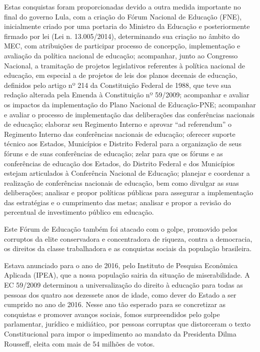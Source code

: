 Estas conquistas foram proporcionadas devido a outra medida importante
no final do governo Lula, com a criação do Fórum Nacional de Educação
(FNE), inicialmente criado por uma portaria do Ministro da Educação e
posteriormente firmado por lei (Lei n. 13.005/2014), determinando sua
criação no âmbito do MEC, com atribuições de participar processo de
concepção, implementação e avaliação da política nacional de educação;
acompanhar, junto ao Congresso Nacional, a tramitação de projetos
legislativos referentes à política nacional de educação, em especial a
de projetos de leis dos planos decenais de educação, definidos pelo
artigo nº 214 da Constituição Federal de 1988, que teve sua redação
alterada pela Emenda à Constituição nº 59/2009; acompanhar e avaliar os
impactos da implementação do Plano Nacional de Educação-PNE; acompanhar
e avaliar o processo de implementação das deliberações das conferências
nacionais de educação; elaborar seu Regimento Interno e aprovar ``ad
referendum'' o Regimento Interno das conferências nacionais de educação;
oferecer suporte técnico aos Estados, Municípios e Distrito Federal para
a organização de seus fóruns e de suas conferências de educação; zelar
para que os fóruns e as conferências de educação dos Estados, do
Distrito Federal e dos Municípios estejam articulados à Conferência
Nacional de Educação; planejar e coordenar a realização de conferências
nacionais de educação, bem como divulgar as suas deliberações; analisar
e propor políticas públicas para assegurar a implementação das
estratégias e o cumprimento das metas;
\protect\hypertarget{art5uxa7iii}{}{}analisar e propor a revisão do
percentual de investimento público em educação.

Este Fórum de Educação também foi atacado com o golpe, promovido pelos
corruptos da elite conservadora e concentradora de riqueza, contra a
democracia, os direitos da classe trabalhadora e as conquistas sociais
da população brasileira.

Estava anunciado para o ano de 2016, pelo Instituto de Pesquisa
Econômica Aplicada (IPEA), que a nossa população sairia da situação de
miserabilidade. A EC 59/2009 determinou a universalização do direito à
educação para todas as pessoas dos quatro aos dezessete anos de idade,
como dever do Estado a ser cumprido no ano de 2016. Nesse ano tão
esperado para se concretizar as conquistas e promover avanços sociais,
fomos surpreendidos pelo golpe parlamentar, jurídico e midiático, por
pessoas corruptas que distorceram o texto Constitucional para impor o
impedimento ao mandato da Presidenta Dilma Rousseff, eleita com mais de
54 milhões de votos.


